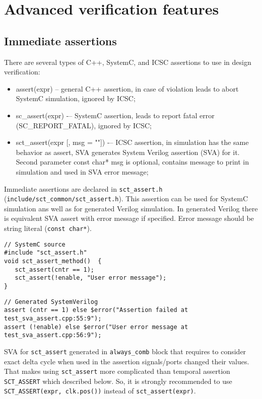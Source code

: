 \section{Advanced verification features}\label{section:assertions}

\subsection{Immediate assertions}

There are several types of C++, SystemC, and ICSC assertions to use in design verification:

\begin{itemize}
\item assert(expr) -- general C++ assertion, in case of violation leads to abort SystemC simulation, ignored by ICSC;
\item sc\_assert(expr) -– SystemC assertion, leads to report fatal error (SC\_REPORT\_FATAL), ignored by ICSC;
\item sct\_assert(expr [, msg = ""]) -– ICSC assertion, in simulation has the same behavior as assert, SVA generates System Verilog assertion (SVA) for it. Second parameter const char* msg is optional, contains message to print in simulation and used in SVA error message;
\end{itemize}

Immediate assertions are declared in {\tt sct\_assert.h} ({\tt include/sct\_common/sct\_assert.h}). This assertion can be used for SystemC simulation ans well as for generated Verilog simulation. In generated Verilog there is equivalent SVA assert with error message if specified. Error message should be string literal ({\tt const char*}).

\begin{lstlisting}[style=mycpp]
// SystemC source
#include "sct_assert.h"
void sct_assert_method()  {
   sct_assert(cntr == 1);
   sct_assert(!enable, "User error message");
}
\end{lstlisting}
%
\begin{lstlisting}[style=myverilog]
// Generated SystemVerilog
assert (cntr == 1) else $error("Assertion failed at test_sva_assert.cpp:55:9");
assert (!enable) else $error("User error message at test_sva_assert.cpp:56:9");
\end{lstlisting}

SVA for {\tt sct\_assert} generated in {\tt always\_comb} block that requires to consider exact delta cycle when used in the assertion signals/ports changed their values. That makes using {\tt sct\_assert} more complicated than temporal assertion {\tt SCT\_ASSERT} which described below. So, it is strongly recommended to use {\tt SCT\_ASSERT(expr, clk.pos())} instead of {\tt sct\_assert(expr)}.

